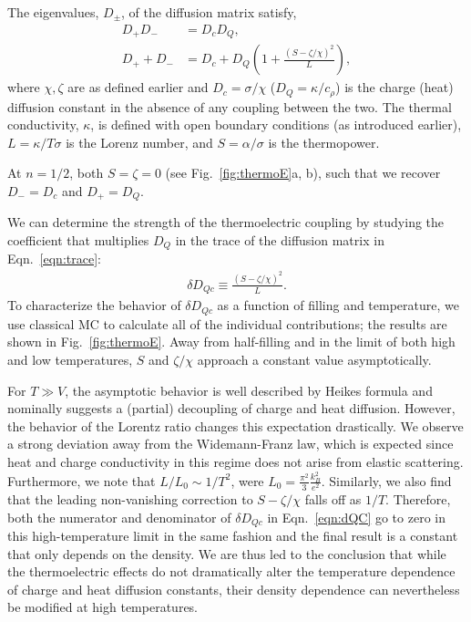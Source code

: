 \documentclass[aps,prx,onecolumn,amsmath,nofootinbib,amssymb,11pt]{revtex4-1}
\def \beq {\begin{eqnarray}}
\def \eeq {\end{eqnarray}}
\begin{document}
{\begin{appendix}
The eigenvalues, $D_\pm$, of the diffusion matrix satisfy,
\begin{align}
D_+ D_- &= D_c D_Q, \label{eqn:dete}\\
D_+ + D_- &=D_c + D_Q \left( 1+ \frac{(S-\zeta  / \chi )^2}{L} \right), \label{eqn:trace}
\end{align}
where $\chi,\zeta$ are as defined earlier and $D_c=\sigma/\chi$ ($D_Q=\kappa /c_{\rho}$) is the charge (heat) diffusion constant in the absence of any coupling between the two. The thermal conductivity, $\kappa$, is defined with open boundary conditions (as introduced earlier), $L=\kappa/T\sigma$ is the Lorenz number, and $S=\alpha/\sigma$ is the thermopower. 

At $n=1/2$, both $S=\zeta=0$ (see Fig.~\ref{fig:thermoE}a, b),  such that we recover $D_{-}=D_c$ and $D_{+}=D_Q$. 

We can determine the strength of the thermoelectric coupling by studying the coefficient that multiplies $D_Q$ in the trace of the diffusion matrix in Eqn.~\ref{eqn:trace}: 
\beq{}
\delta D_{Qc} \equiv \frac{(S-\zeta  / \chi )^2}{L} .
\label{eqn:dQC}
\eeq{}
To characterize the behavior of $\delta D_{Qc}$ as a function of filling and temperature, we use classical MC to calculate all of the individual contributions; the results are shown in Fig.~\ref{fig:thermoE}. Away from half-filling and in the limit of both high and low temperatures, $S$ and $\zeta/\chi$ approach a constant value asymptotically. 

For $T\gg V$, the asymptotic behavior is well described by Heikes formula \cite{ChaikinThermopower} and nominally suggests a (partial) decoupling of charge and heat diffusion. However, the behavior of the Lorentz ratio changes this expectation drastically. We observe a strong deviation away from the Widemann-Franz law, which is expected since heat and charge conductivity in this regime does not arise from elastic scattering. Furthermore, we note that $ L/L_0 \sim 1/T^2$, were $L_0 = \frac{\pi^2}{3} \frac{k_B^2}{e^2} $. Similarly, we also find that the leading non-vanishing correction to $S-\zeta/\chi$ falls off as $1/T$. Therefore, both the numerator and denominator of $\delta D_{Qc}$ in Eqn.~\ref{eqn:dQC} go to zero in this high-temperature limit in the same fashion and the final result is a constant that only depends on the density. We are thus led to the conclusion that while the thermoelectric effects do not dramatically alter the temperature dependence of charge and heat diffusion constants, their density dependence can nevertheless be modified at high temperatures. 



\end{appendix}}
\end{document}
